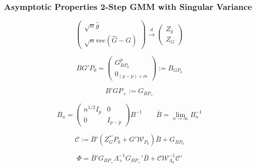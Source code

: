 \documentclass{beamer}
\begin{document}
    \begin{frame}
    \frametitle{Asymptotic Properties 2-Step GMM with Singular Variance}

\begin{equation*}\left(\begin{array}{c}\sqrt{n}\hat{g} \\ \sqrt{n} \textrm{vec}(\hat{G}-G) \end{array}\right)\overset{d}{\rightarrow}  \left( \begin{array}{c}Z_g \\ Z_G \end{array}\right) \end{equation*}

\begin{equation*} BG'P_0=\left(\begin{array}{c} G_{BP_0}^{\bar{p}} \\ 0_{(p-\bar{p})\times \bar{m}}\end{array}\right):=B_{GP_0} \end{equation*}

 \begin{equation*} B'GP_+:=G_{BP_+} \end{equation*}


 \begin{equation*} B_n=\left(\begin{array}{cc} n^{1/2}I_{\bar{p}} & 0\\ 0 & I_{p-\bar{p}}\end{array}\right)B^{-1}     \qquad \bar{B}=\lim_{n\rightarrow\infty} B_n^{-1}\end{equation*}

\begin{equation*} \mathcal{C}:=\bar{B}'(Z_{G}^{*'}P_0+ G'\mathcal{W}_{P_0})\bar{B}+G_{BP_0} \end{equation*}


\begin{equation*} \Phi= \bar{B}'G_{BP_+}\Lambda_+^{-1}G_{BP_+}'\bar{B}+\mathcal{C}\mathcal{W}_{\Lambda_0}^{-1}\mathcal{C}'\end{equation*}


    \end{frame}
\end{document}
